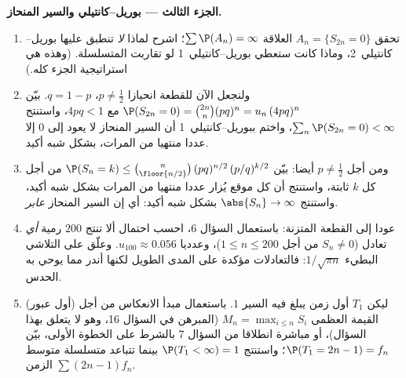 \begin{problem}
\medskip
\noindent\textbf{الجزء الثالث --- بوريل--كانتيلي والسير المنحاز.}
\begin{enumerate}[resume]
  \item تحقق  $A_n = \{S_{2n} = 0\}$ العلاقة $\sum\P(A_n)
        = \infty$؛ اشرح لماذا \emph{لا}
        تنطبق عليها بوريل--كانتيلي~2، وماذا كانت ستعطي
        بوريل--كانتيلي~1 لو تقاربت المتسلسلة. (وهذه هي استراتيجية
        الجزء كله.)
  \item ولنجعل الآن للقطعة انحيازا $p \neq \frac12$، $q = 1 -
        p$. بيّن $\P(S_{2n} = 0) = \binom{2n}n(pq)^n =
        u_n\,(4pq)^n$ مع
        $4pq < 1$، واستنتج $\sum_n\P(S_{2n} = 0) < \infty$، واختم ببوريل--كانتيلي~1 أن السير
        المنحاز لا يعود إلى $0$ إلا عددا منتهيا من المرات، بشكل
        شبه أكيد.
  \item ومن أجل $p \neq \frac12$ أيضا: بيّن $\P(S_n = k) \leq
        \binom{n}{\floor{n/2}}\,(pq)^{n/2}\,(p/q)^{k/2}$ من أجل كل $k$ ثابتة،
        واستنتج أن كل موقع يُزار عددا منتهيا من المرات بشكل شبه أكيد،
        واستنتج $\abs{S_n} \to \infty$ بشكل شبه أكيد: أي إن السير المنحاز
        \emph{عابر}.
  \item عودا إلى القطعة المتزنة: باستعمال السؤال 6، احسب احتمال ألا
        تنتج $200$ رمية \emph{أي} تعادل ($S_n \neq 0$ من أجل $1 \leq n \leq 200$)،
        وعدديا $u_{100} \approx 0.056$. وعلّق على التلاشي البطيء $1/\sqrt{\pi n}$: فالتعادلات
        مؤكدة على المدى الطويل لكنها أندر مما يوحي به الحدس.
  \item (أول عبور) ليكن $T_1$ أول زمن يبلغ فيه السير $1$.
        باستعمال مبدأ الانعكاس من أجل القيمة العظمى $M_n = \max_{i\leq n}S_i$ (المبرهن
        في السؤال 16، وهو لا يتعلق بهذا السؤال)، أو مباشرة انطلاقا
        من السؤال 7 بالشرط على الخطوة الأولى، بيّن $\P(T_1 = 2n - 1) = f_n$؛ واستنتج
        $\P(T_1 <
        \infty) = 1$ بينما تتباعد متسلسلة متوسط الزمن $\sum(2n-1)f_n$.
\end{enumerate}


\end{problem}
